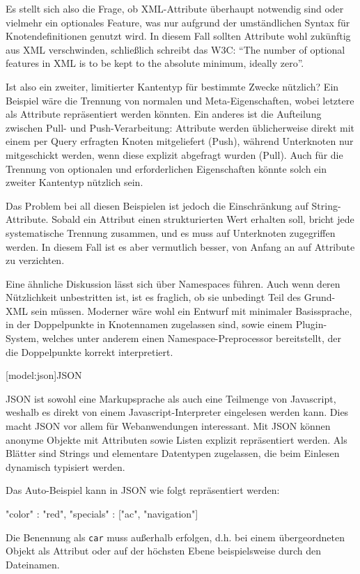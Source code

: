\documentclass[11pt, a4paper, bibgerm]{book}
\newcommand\icode[1]{\lstinline?#1?}
\newcommand\lsection{}
\begin{document}
Es stellt sich also die Frage, ob XML-Attribute überhaupt notwendig sind
oder vielmehr ein optionales Feature, was nur aufgrund der umständlichen
Syntax für Knotendefinitionen genutzt wird. In diesem Fall
sollten Attribute wohl zukünftig aus XML verschwinden, schließlich
schreibt das W3C\cite{rec_xml}: "`The number of optional features in XML
is to be kept to the absolute minimum, ideally zero"'.

Ist also ein zweiter, limitierter Kantentyp für bestimmte Zwecke
nützlich? Ein Beispiel wäre die Trennung von normalen und
Meta-Eigenschaften, wobei letztere als Attribute repräsentiert werden
könnten. Ein anderes ist die Aufteilung zwischen Pull- und
Push-Verarbeitung: Attribute werden üblicherweise direkt mit einem per
Query erfragten Knoten mitgeliefert (Push), während Unterknoten nur
mitgeschickt werden, wenn diese explizit abgefragt wurden (Pull). Auch
für die Trennung von optionalen und erforderlichen Eigenschaften könnte
solch ein zweiter Kantentyp nützlich sein.

Das Problem bei all diesen Beispielen ist jedoch die Einschränkung auf
String-Attribute. Sobald ein Attribut einen strukturierten Wert erhalten
soll, bricht jede systematische Trennung zusammen, und es muss auf
Unterknoten zugegriffen werden. In diesem Fall ist es aber vermutlich
besser, von Anfang an auf Attribute zu verzichten.

Eine ähnliche Diskussion lässt sich über Namespaces führen. Auch wenn
deren Nützlichkeit unbestritten ist, ist es fraglich, ob sie unbedingt
Teil des Grund-XML sein müssen. Moderner wäre wohl ein Entwurf mit
minimaler Basissprache, in der Doppelpunkte in Knotennamen zugelassen
sind, sowie einem Plugin-System, welches unter anderem einen
Namespace-Preprocessor bereitstellt, der die Doppelpunkte korrekt
interpretiert.

\lsection[model:json]{JSON}

JSON ist sowohl eine Markupsprache als auch eine Teilmenge von
Javascript, weshalb es direkt von einem Javascript-Interpreter
eingelesen werden kann. Dies macht JSON vor allem für Webanwendungen
interessant. Mit JSON können anonyme Objekte mit Attributen sowie Listen
explizit repräsentiert werden. Als Blätter sind Strings und elementare
Datentypen zugelassen, die beim Einlesen dynamisch typisiert werden.

Das Auto-Beispiel kann in JSON wie folgt repräsentiert werden:
\begin{code}
{
  "color"    : "red",
  "specials" : ["ac", "navigation"]
}
\end{code}
Die Benennung als \icode{car} muss außerhalb erfolgen, d.h. bei einem
übergeordneten Objekt als Attribut oder auf der höchsten Ebene
beispielsweise durch den Dateinamen.
\end{document}
